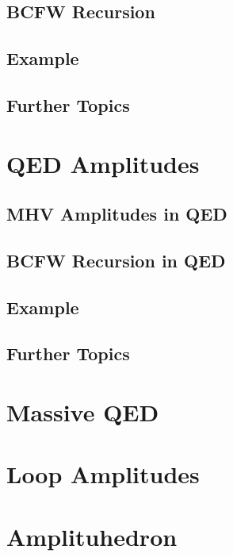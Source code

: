 \subsection{BCFW Recursion}


\subsection{Example}

\subsection{Further Topics}


\section{QED Amplitudes}
\label{sec:qed-amplitudes}

\subsection{MHV Amplitudes in QED}
\label{sec:mhv-amplitudes-qed}

\subsection{BCFW Recursion in QED}
\label{sec:bcfw-recursion-qed}

\subsection{Example}

\subsection{Further Topics}

\section{Massive QED}


\section{Loop Amplitudes}

\section{Amplituhedron}
\label{sec:amplituhedron}